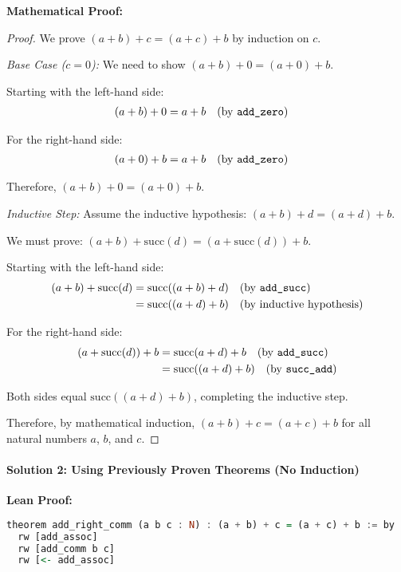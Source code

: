 \documentclass{article}
\theoremstyle{theorem}
\theoremstyle{definition}
\theoremstyle{remark}
\begin{document}
\textbf{Mathematical Proof:}
\begin{proof}
We prove $(a + b) + c = (a + c) + b$ by induction on $c$.

\textit{Base Case ($c = 0$):} We need to show $(a + b) + 0 = (a + 0) + b$.

Starting with the left-hand side:
\begin{align*}
(a + b) + 0 &= a + b \quad \text{(by \texttt{add\_zero})}
\end{align*}

For the right-hand side:
\begin{align*}
(a + 0) + b &= a + b \quad \text{(by \texttt{add\_zero})}
\end{align*}

Therefore, $(a + b) + 0 = (a + 0) + b$. \checkmark

\textit{Inductive Step:} Assume the inductive hypothesis: $(a + b) + d = (a + d) + b$.

We must prove: $(a + b) + \text{succ}(d) = (a + \text{succ}(d)) + b$.

Starting with the left-hand side:
\begin{align*}
(a + b) + \text{succ}(d) &= \text{succ}((a + b) + d) \quad \text{(by \texttt{add\_succ})}\\
&= \text{succ}((a + d) + b) \quad \text{(by inductive hypothesis)}
\end{align*}

For the right-hand side:
\begin{align*}
(a + \text{succ}(d)) + b &= \text{succ}(a + d) + b \quad \text{(by \texttt{add\_succ})}\\
&= \text{succ}((a + d) + b) \quad \text{(by \texttt{succ\_add})}
\end{align*}

Both sides equal $\text{succ}((a + d) + b)$, completing the inductive step.

Therefore, by mathematical induction, $(a + b) + c = (a + c) + b$ for all natural numbers $a$, $b$, and $c$.
\end{proof}

\paragraph{Solution 2: Using Previously Proven Theorems (No Induction)}

\textbf{Lean Proof:}
\begin{lstlisting}[language=haskell]
theorem add_right_comm (a b c : N) : (a + b) + c = (a + c) + b := by
  rw [add_assoc]
  rw [add_comm b c]
  rw [<- add_assoc]
\end{lstlisting}
\end{document}
